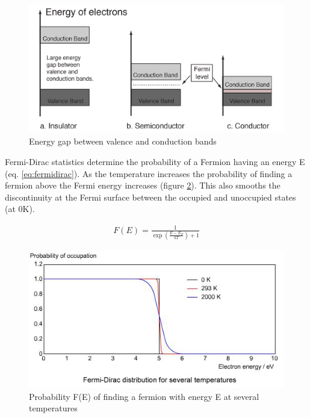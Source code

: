 \begin{figure}
\centering
\begin{minipage}{.65\textwidth}
\centering
    \includegraphics[width=.7\linewidth]{chapters/interatomic_potential_fitting/images/energy-bands-hyperphysics.png}
    \caption{Energy gap between valence and conduction bands\cite{bandgapshyperphysics}}
    \label{fig:bandgapshyperphysics}
\end{minipage}
\end{figure}

Fermi-Dirac statistics determine the probability of a Fermion having an energy E (eq. \ref{eq:fermidirac}).  As the temperature increases the probability of finding a fermion above the Fermi energy increases (figure \ref{fig:fermidiracdist}).  This also smooths the discontinuity at the Fermi surface between the occupied and unoccupied states (at 0K). 

\begin{equation}
\begin{split}
F(E) = \frac{1}{\exp(\frac{E - E_F}{kT}) + 1}
\end{split}
\label{eq:fermidirac}
\end{equation}

\begin{figure}
\centering
\begin{minipage}{.65\textwidth}
\centering
    \includegraphics[width=.7\linewidth]{chapters/interatomic_potential_fitting/images/fermiDirac.jpg}
    \caption{Probability F(E) of finding a fermion with energy E at several temperatures\cite{fermidiracdist}}
    \label{fig:fermidiracdist}
\end{minipage}
\end{figure}

